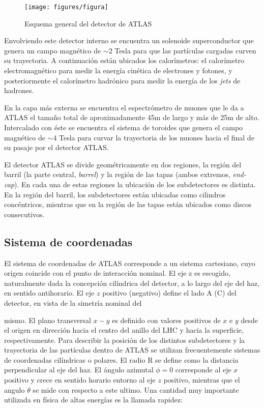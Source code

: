\begin{figure}[H]
  \centering
  \texttt{[image: figures/figura]}
  \caption{Esquema general del detector de ATLAS}\label{fig:atlas}
\end{figure}


Envolviendo este detector interno se encuentra un solenoide superconductor que genera un campo
magnético de $\sim$2 Tesla para que las partículas cargadas curven su trayectoria.
A continuación están ubicados los calorímetros: el calorímetro electromagnético para medir la
energía cinética de electrones y fotones, y posteriormente el calorímetro hadrónico para medir
la energía de los \emph{jets} de hadrones.

En la capa más externa se encuentra el espectrómetro de muones que le da a ATLAS el tamaño total
de aproximadamente 45m de largo y más de 25m de alto.
Intercalado con éste se encuentra el sistema de toroides que genera el campo magnético de $\sim$4
Tesla para curvar la trayectoria de los muones hacia el final de su pasaje por el detector ATLAS.

El detector ATLAS se divide geométricamente en dos regiones, la región del barril
(la parte central, \emph{barrel}) y la región de las tapas (ambos extremos, \emph{end-cap}).
En cada una de estas regiones la ubicación de los subdetectores es distinta. En la región del barril,
los subdetectores están ubicadas como cilindros concéntricos, mientras que en la región de las tapas
están ubicados como discos consecutivos.

\subsection{Sistema de coordenadas}

El sistema de coordenadas de ATLAS corresponde a un sistema cartesiano, cuyo origen
coincide con el punto de interacción nominal. El eje z es escogido, naturalmente dada la
concepción cilíndrica del detector, a lo largo del eje del haz, en sentido antihorario. El eje
$z$ positivo (negativo) define el lado A (C) del detector, en vista de la simetría nominal del

mismo. El plano transversal $x-y$ es definido con valores positivos de $x$ e $y$ desde el origen
en dirección hacia el centro del anillo del LHC y hacia la superficie, respectivamente.
Para describir la posición de los distintos subdetectores y la trayectoria de las partículas
dentro de ATLAS se utilizan frecuentemente sistemas de coordenadas cilíndricas o polares.
El radio R se define como la distancia perpendicular al eje del haz.  El ángulo azimutal
$\phi = 0$ corresponde al eje $x$ positivo y crece en sentido horario entorno al eje $z$ positivo,
mientras que el angulo $\theta$ se mide con respecto a este ultimo. Una cantidad muy importante
utilizada en física de altas energías es la llamada rapidez:

